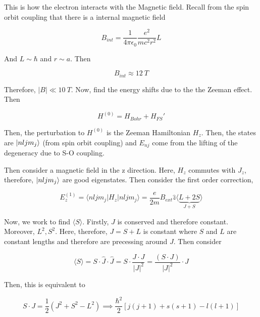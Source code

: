 \documentclass{article}
\newtheorem{one minute paper}[theorem]{One Minute Paper}
\begin{document}
This is how the electron interacts with the Magnetic field. Recall from the spin orbit coupling that there is a internal magnetic field 

\begin{equation}
    B_{int} = \frac{1}{4\pi \epsilon_0}\frac{e^2}{mc^2 r^2}L
\end{equation}

And $L \sim \hbar$ and $r \sim a$. Then 

\begin{equation}
    B_{int} \approx 12~T
\end{equation}

Therefore, $|B| \ll 10~T$. Now, find the energy shifts due to the the Zeeman effect. Then 

\begin{equation}
    H^{(0)} = H_{Bohr} + H_{FS}'
\end{equation}

Then, the perturbation to $H^{(0)}$ is the Zeeman Hamiltonian $H_z$. Then, the states are $\ket{nljm_j}$ (from spin orbit coupling) and $E_{nj}$ come from the lifting of the degeneracy due to S-O coupling. 

Then consider a magnetic field in the z direction. Here, $H_z$ commutes with $J_z$, therefore, $\ket{nljm_j}$ are good eigenstates. Then consider the first order correction, 

\begin{equation}
    E_z^{(1)} = \langle nljm_j | H_z | nljm_j \rangle = \frac{e}{2m}B_{ext}\hat{z}\langle \underbrace{L + 2S }_{J + S}\rangle
\end{equation}

Now, we work to find $\langle S \rangle$. Firstly, $J$ is conserved and therefore constant. Moreover, $L^2, S^2$. Here, therefore, $J = S + L$ is constant where $S$ and $L$ are constant lengths and therefore are precessing around $J$. Then consider 

\begin{equation}
    \langle S \rangle = S \cdot \hat{J} \cdot \hat{J} =  S \cdot \frac{J \cdot J}{|J|^2} = \frac{(S \cdot J)}{|J|^2}\cdot J
\end{equation}

Then, this is equivalent to  

\begin{equation}
    S\cdot J = \frac{1}{2}\left( J^2 + S^2 - L^2 \right) \implies \frac{\hbar^2}{2}\left[ j(j+1) + s(s+1) - l(l+1) \right]
\end{equation}
\end{document}
